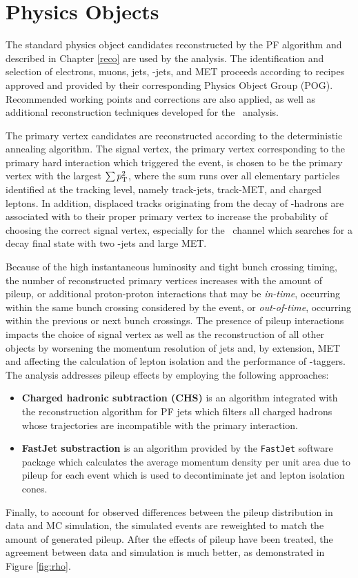 \section{Physics Objects}

The standard physics object candidates reconstructed by the PF algorithm and described in Chapter \ref{reco} are used by the analysis. The identification and selection of electrons, muons, jets, \qrkb-jets, and MET proceeds according to recipes approved and provided by their corresponding Physics Object Group (POG). Recommended working points and corrections are also applied, as well as additional reconstruction techniques developed for the \VHbb\ analysis.

The primary vertex candidates are reconstructed according to the deterministic annealing algorithm.\cite{ITERTRACK} The signal vertex, the primary vertex corresponding to the primary hard interaction which triggered the event, is chosen to be the primary vertex with the largest $\sum p_{\mathrm{T}}^{2}$, where the sum runs over all elementary particles identified at the tracking level, namely track-jets, track-MET, and charged leptons. In addition, displaced tracks originating from the decay of \qrkb-hadrons are associated with to their proper primary vertex to increase the probability of choosing the correct signal vertex, especially for the \ZnnH\ channel which searches for a decay final state with two \qrkb-jets and large MET.

Because of the high instantaneous luminosity and tight bunch crossing timing, the number of reconstructed primary vertices increases with the amount of pileup, or additional proton-proton interactions that may be \textit{in-time}, occurring within the same bunch crossing considered by the event, or \textit{out-of-time}, occurring within the previous or next bunch crossings. The presence of pileup interactions impacts the choice of signal vertex as well as the reconstruction of all other objects by worsening the momentum resolution of jets and, by extension, MET and affecting the calculation of lepton isolation and the performance of \qrkb-taggers. The analysis addresses pileup effects by employing the following approaches:
\begin{itemize}
  \item \textbf{Charged hadronic subtraction (CHS)} is an algorithm integrated with the reconstruction algorithm for PF jets which filters all charged hadrons whose trajectories are incompatible with the primary interaction.
  \item \textbf{FastJet substraction} is an algorithm provided by the \texttt{FastJet}\cite{FASTJET} software package which calculates the average momentum density per unit area due to pileup for each event which is used to decontiminate jet and lepton isolation cones.
\end{itemize}
Finally, to account for observed differences between the pileup distribution in data and MC simulation, the simulated events are reweighted to match the amount of generated pileup. After the effects of pileup have been treated, the agreement between data and simulation is much better, as demonstrated in Figure \ref{fig:rho}.

